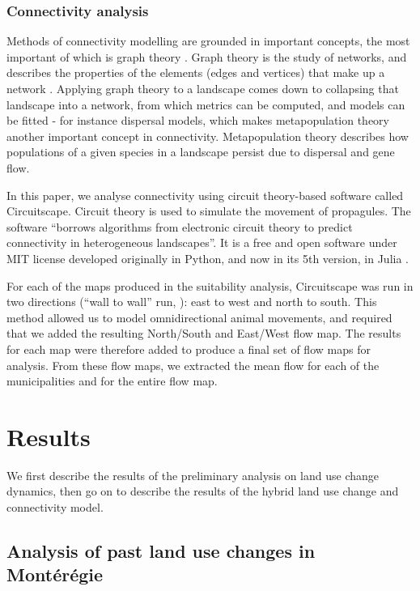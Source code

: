 \subsubsection{Connectivity analysis}

Methods of connectivity modelling are grounded in important concepts, the most important of which is graph theory \citep{dale_graphs_2010}. Graph theory is the study of networks, and describes the properties of the elements (edges and vertices) that make up a network . Applying graph theory to a landscape comes down to collapsing that landscape into a network, from which metrics can be computed, and models can be fitted - for instance dispersal models, which makes metapopulation theory another important concept in connectivity\citep{hanski_habitat_1999}. Metapopulation theory describes how populations of a given species in a landscape persist due to dispersal and gene flow.

In this paper, we analyse connectivity using circuit theory-based software called Circuitscape. Circuit theory is used to simulate the movement of propagules. The software “borrows algorithms from electronic circuit theory to predict connectivity in heterogeneous landscapes''. It is a free and open software under MIT license developed originally in Python, and now in its 5th version, in Julia \citep{circuitjulia}.

For each of the maps produced in the suitability analysis, Circuitscape was run in two directions (“wall to wall” run, \cite{mcrae_conserving_2016}): east to west and north to south. This method allowed us to model omnidirectional animal movements, and required that we added the resulting North/South and East/West flow map. The results for each map were therefore added to produce a final set of flow maps for analysis. From these flow maps, we extracted the mean flow for each of the municipalities and for the entire flow map. \\

\section{Results}

We first describe the results of the preliminary analysis on land use change dynamics, then go on to describe the results of the hybrid land use change and connectivity model.

\subsection{Analysis of past land use changes in Montérégie}

